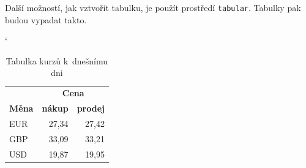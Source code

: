\documentclass[a4paper,11pt]{article}
\begin{document}
	Další možností, jak vztvořit tabulku, je použít prostředí \texttt{tabular}. Tabulky pak budou vypadat takto\footnotemark. 
	
	\begin{table}[ht]
		\catcode`
		\begin{center}
			\begin{tabular}{| l | r | r |}
				\hline
				 & \multicolumn{2}{|c|}{\textbf{Cena}} \\\cline{2-3} 
				\textbf{Měna} & \textbf{nákup} & \textbf{prodej} \\ \hline
				EUR & 27,34 & 27,42 \\
				GBP & 33,09 & 33,21 \\
				USD & 19,87 & 19,95 \\\hline
			\end{tabular}
			\caption{Tabulka kurzů k~dnešnímu dni}
			\label{tabKurzu}
		\end{center}
	\end{table}
	
\end{document}

